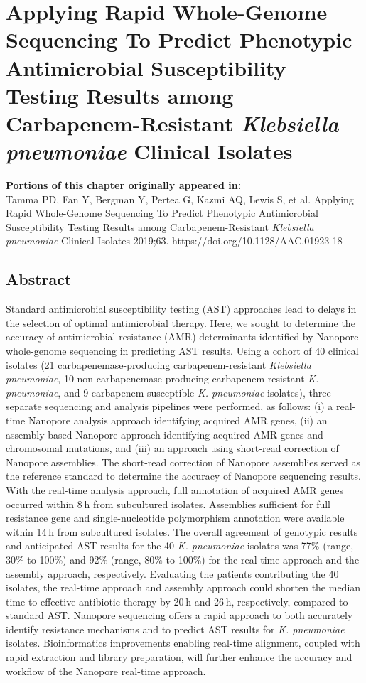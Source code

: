\chapter{Applying Rapid Whole-Genome Sequencing To Predict Phenotypic Antimicrobial Susceptibility Testing Results among Carbapenem-Resistant \textit{Klebsiella pneumoniae} Clinical Isolates}
\label{chap:amr}

\textbf{Portions of this chapter originally appeared in:} \\
Tamma PD, Fan Y, Bergman Y, Pertea G, Kazmi AQ, Lewis S, et al. Applying Rapid Whole-Genome Sequencing To Predict Phenotypic Antimicrobial Susceptibility Testing Results among Carbapenem-Resistant \textit{Klebsiella pneumoniae} Clinical Isolates 2019;63. https://doi.org/10.1128/AAC.01923-18

\section{Abstract}
\label{sec:abstract}

Standard antimicrobial susceptibility testing (AST) approaches lead to delays in the selection of optimal antimicrobial therapy. Here, we sought to determine the accuracy of antimicrobial resistance (AMR) determinants identified by Nanopore whole-genome sequencing in predicting AST results. Using a cohort of 40 clinical isolates (21 carbapenemase-producing carbapenem-resistant \textit{Klebsiella pneumoniae}, 10 non-carbapenemase-producing carbapenem-resistant \textit{K. pneumoniae}, and 9 carbapenem-susceptible \textit{K. pneumoniae} isolates), three separate sequencing and analysis pipelines were performed, as follows: (i) a real-time Nanopore analysis approach identifying acquired AMR genes, (ii) an assembly-based Nanopore approach identifying acquired AMR genes and chromosomal mutations, and (iii) an approach using short-read correction of Nanopore assemblies. The short-read correction of Nanopore assemblies served as the reference standard to determine the accuracy of Nanopore sequencing results. With the real-time analysis approach, full annotation of acquired AMR genes occurred within 8 h from subcultured isolates. Assemblies sufficient for full resistance gene and single-nucleotide polymorphism annotation were available within 14 h from subcultured isolates. The overall agreement of genotypic results and anticipated AST results for the 40 \textit{K. pneumoniae} isolates was 77\% (range, 30\% to 100\%) and 92\% (range, 80\% to 100\%) for the real-time approach and the assembly approach, respectively. Evaluating the patients contributing the 40 isolates, the real-time approach and assembly approach could shorten the median time to effective antibiotic therapy by 20 h and 26 h, respectively, compared to standard AST. Nanopore sequencing offers a rapid approach to both accurately identify resistance mechanisms and to predict AST results for \textit{K. pneumoniae} isolates. Bioinformatics improvements enabling real-time alignment, coupled with rapid extraction and library preparation, will further enhance the accuracy and workflow of the Nanopore real-time approach.

